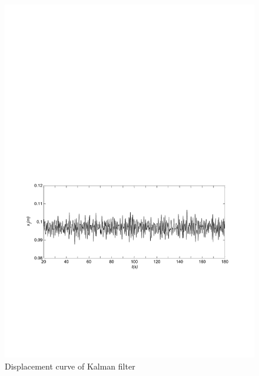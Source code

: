 \begin{figure}[!htb]
  \centering
  \includegraphics[width=\hsize]{MATLAB-kalman.pdf}
  \caption{Displacement curve of Kalman filter}
  \label{fig:kalman}
\end{figure}

